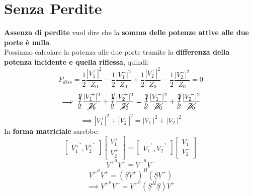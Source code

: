 \section{Senza Perdite}
\textbf{Assenza di perdite} vuol dire che la \textbf{somma delle potenze attive alle due porte è nulla}.\\
Possiamo calcolare la potenza alle due porte tramite la \textbf{differenza della potenza incidente e quella riflessa}, quindi:
\begin{equation*}
    P_{diss} = \frac{1}{2} \frac{|V_1^+|^2}{Z_0} - \frac{1}{2} \frac{|V_1^-|^2}{Z_0} + \frac{1}{2} \frac{|V_2^+|^2}{Z_0} - \frac{1}{2} \frac{|V_2^-|^2}{Z_0} = 0
\end{equation*}
\begin{equation*}
    \implies \cancel{\frac{1}{2}} \frac{|V_1^+|^2}{\cancel{Z_0}} + \cancel{\frac{1}{2}} \frac{|V_2^+|^2}{\cancel{Z_0}} = \cancel{\frac{1}{2}} \frac{|V_1^-|^2}{\cancel{Z_0}} + \cancel{\frac{1}{2}} \frac{|V_2^-|^2}{\cancel{Z_0}}
\end{equation*}
\begin{equation*}
    \implies |V_1^+|^2 + |V_2^+|^2 = |V_1^-|^2 + |V_2^-|^2
\end{equation*}
In \textbf{forma matriciale} sarebbe:
\begin{equation*}
    \begin{bmatrix}
    V_1^{+^*}, V_2^{+^*}
    \end{bmatrix}
    \begin{bmatrix}
    V_1^{+}\\ V_2^{+}
    \end{bmatrix}
    =
    \begin{bmatrix}
    V_1^{-^*}, V_2^{-^*}
    \end{bmatrix}
    \begin{bmatrix}
    V_1^{-}\\ V_2^{-}
    \end{bmatrix}
\end{equation*}
\begin{equation*}
    {\underline{V}}^{+^H} {\underline{V}}^+ = {\underline{V}}^{-^H} {\underline{V}}^-
\end{equation*}
\begin{equation*}
    {\underline{V}}^{+^H} {\underline{V}}^+ = \left(\underline{\underline{S}}{\underline{V}}^{+} \right)^H \left(\underline{\underline{S}}{\underline{V}}^{+} \right)
\end{equation*}
\begin{equation*}
    \implies \underline{{V}}^{+^H} {\underline{V}}^{+} = {\underline{V}}^{+^H} \left(\underline{\underline{S}}^H\underline{\underline{S}}\right){\underline{V}}^{+}
\end{equation*}
